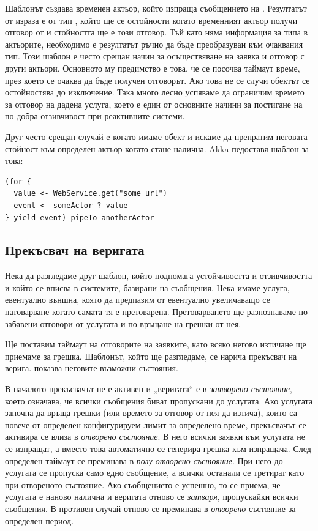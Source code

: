 Шаблонът създава временен актьор, който изпраща съобщението  на . Резултатът от израза е от тип , който ще се остойности когато временният актьор получи отговор от  и стойността ще е този отговор. Тъй като няма информация за типа в актьорите, необходимо е резултатът ръчно да бъде преобразуван към очаквания тип. Този шаблон е често срещан начин за осъществяване на заявка и отговор с други актьори. Основното му предимство е това, че се посочва таймаут време, през което се очаква да бъде получен отговорът. Ако това не се случи  обектът се остойностява до  изключение. Така много лесно успяваме да ограничим времето за отговор на дадена услуга, което е един от основните начини за постигане на по-добра отзивчивост при реактивните системи.

Друг често срещан случай е когато имаме  обект и искаме да препратим неговата стойност към определен актьор когато стане налична. Akka педоставя  шаблон за това:

\begin{lstlisting}
(for {
  value <- WebService.get("some url")
  event <- someActor ? value
} yield event) pipeTo anotherActor
\end{lstlisting}

\subsection{Прекъсвач на веригата}

Нека да разгледаме друг шаблон, който подпомага устойчивостта и отзивчивостта и който се вписва в системите, базирани на съобщения. Нека имаме услуга, евентуално външна, която да предпазим от евентуално увеличаващо се натоварване когато самата тя е претоварена. Претоварването ще разпознаваме по забавени отговори от услугата и по връщане на грешки от нея.

Ще поставим таймаут на отговорите на заявките, като всяко негово изтичане ще приемаме за грешка. Шаблонът, който ще разгледаме, се нарича прекъсвач на верига.  показва неговите възможни състояния.

В началото прекъсвачът не е активен и „веригата“ е в \emph{затворено състояние}, което означава, че всички съобщения биват пропускани до услугата. Ако услугата започна да връща грешки (или времето за отговор от нея да изтича), които са повече от определен конфигурируем лимит за определено време, прекъсвачът се активира се влиза в \emph{отворено състояние}. В него всички заявки към услугата не се изпращат, а вместо това автоматично се генерира грешка към изпращача. След определен таймаут се преминава в \emph{полу-отворено състояние}. При него до услугата се пропуска само едно съобщение, а всички останали се третират като при отвореното състояние. Ако съобщението е успешно, то се приема, че услугата е наново налична и веригата отново се \emph{затваря}, пропускайки всички съобщения. В противен случай отново се преминава в \emph{отворено} състояние за определен период.

